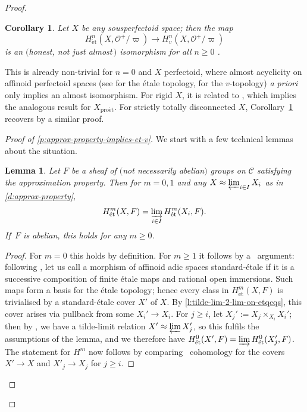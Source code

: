 \documentclass[10pt,a4paper]{article}
\newtheorem{Lemma}[thm]{Lemma}
\newtheorem{Corollary}[thm]{Corollary}
\theoremstyle{definition}
\theoremstyle{remark}
\newcommand{\lra}{\longrightarrow}
\renewcommand{\O}{\mathcal{O}}
\newcommand{\et}{{\operatorname{\acute{e}t}}}
\newcommand{\proet}{{\operatorname{pro\acute{e}t}}}
\newcommand{\cH}{{\ifmmode \check{H}\else{\v{C}ech}\fi}}
\numberwithin{equation}{section}
\begin{document}
\begin{proof}
        \begin{Corollary}\label{cor215}
	  Let $X$ be any sousperfectoid space; then the map
          \[H^n_{\et}(X,\O^+/\varpi)\lra H^n_{v}(X,\O^+/\varpi)\]
		is an $($honest, not just almost\,$)$ isomorphism for all $n\geq 0$ .
	\end{Corollary}

        This is already non-trivial for $n=0$ and $X$ perfectoid, where almost acyclicity on affinoid perfectoid spaces (see \cite[Proposition 7.13]{perfectoid-spaces} for the \'etale topology, \cite[Proposition 8.8]{etale-cohomology-of-diamonds} for the $v$-topology) \textit{a priori} only implies an almost isomorphism. For rigid $X$, it is related to \cite[Lemma 4.2]{Scholze_p-adicHodgeForRigid}, which implies the analogous result for $X_{\proet}$. For strictly totally disconnected $X$, Corollary~\ref{cor215} recovers \cite[Proposition 2.13]{MannWerner_LocSys_p-adVB} by a similar proof.

	\begin{proof}[Proof of \cref{p:approx-property-implies-et-v}]
		We start with a few technical lemmas about the situation. 

	        \begin{Lemma}\label{l:approx-prop-and-cohom}
			Let $F$ be a sheaf of $($not necessarily abelian$)$ groups on $\mathcal C$ satisfying the approximation property. Then for $m=0,1$ and any $X\approx \varprojlim_{i\in I} X_i$ as in \cref{d:approx-property},
			\[H^m_{\et}(X,F)=\varinjlim_{i\in I} H^m_{\et}(X_i,F).\]
			If\, $F$ is abelian, this holds for any $m\geq 0$.
		\end{Lemma}

                \begin{proof}
			For $m=0$ this holds by definition. For $m\geq 1$ it follows by a \cH\ argument: following \cite[Definition 3.6]{heuer-diamantine-Picard}, let us call a morphism of affinoid adic spaces standard-\'etale if it is a successive composition of finite \'etale maps and rational open immersions. Such maps form a basis for the \'etale topology; hence every class in $H^m_{\et}(X,F)$ is trivialised by a standard-\'etale cover $X'$ of $X$. By \cref{l:tilde-lim-2-lim-on-etqcqs}, this cover arises via pullback from some $X_i'\to X_i$. For $j\geq i$, let $X_j':=X_j\times_{X_i}X_i'$; then by 
			\cite[Lemma~3.13]{heuer-diamantine-Picard}, we have a tilde-limit relation $X'\approx \varprojlim X_j'$, so this fulfils the assumptions of the lemma, and we therefore have $H^0_{\et}(X',F)=\varinjlim H^0_{\et}(X'_j,F)$. The statement for $H^m$ now follows by comparing \cH\ cohomology for the covers $X'\to X$ and $X'_j\to X_j$ for $j\geq i$.
		\end{proof}


\end{proof}
\end{proof}
\end{document}
